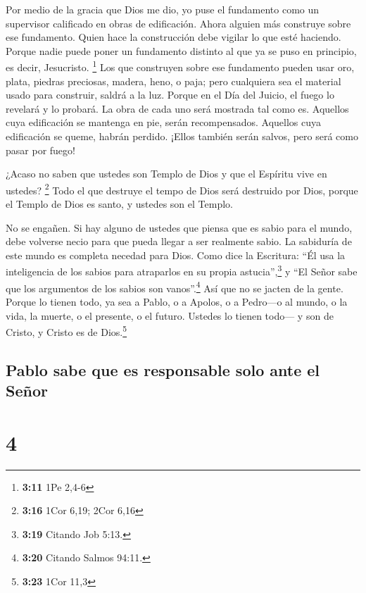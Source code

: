  Por medio de la gracia que Dios me dio, yo puse el
fundamento como un supervisor calificado en obras de edificación. Ahora
alguien más construye sobre ese fundamento. Quien hace la construcción
debe vigilar lo que esté haciendo.  Porque nadie puede
poner un fundamento distinto al que ya se puso en principio, es decir,
Jesucristo. \footnote{\textbf{3:11} 1Pe 2,4-6}  Los que
construyen sobre ese fundamento pueden usar oro, plata, piedras
preciosas, madera, heno, o paja;  pero cualquiera sea el
material usado para construir, saldrá a la luz. Porque en el Día del
Juicio, el fuego lo revelará y lo probará. La obra de cada uno será
mostrada tal como es.  Aquellos cuya edificación se
mantenga en pie, serán recompensados.  Aquellos cuya
edificación se queme, habrán perdido. ¡Ellos también serán salvos, pero
será como pasar por fuego!

 ¿Acaso no saben que ustedes son Templo de Dios y que el
Espíritu vive en ustedes? \footnote{\textbf{3:16} 1Cor 6,19; 2Cor 6,16}
 Todo el que destruye el tempo de Dios será destruido por
Dios, porque el Templo de Dios es santo, y ustedes son el Templo.

 No se engañen. Si hay alguno de ustedes que piensa que
es sabio para el mundo, debe volverse necio para que pueda llegar a ser
realmente sabio.  La sabiduría de este mundo es completa
necedad para Dios. Como dice la Escritura: ``Él usa la inteligencia de
los sabios para atraparlos en su propia astucia'',\footnote{\textbf{3:19}
  Citando Job 5:13.}  y ``El Señor sabe que los
argumentos de los sabios son vanos''.\footnote{\textbf{3:20} Citando
  Salmos 94:11.}  Así que no se jacten de la gente.
Porque lo tienen todo,  ya sea a Pablo, o a Apolos, o a
Pedro---o al mundo, o la vida, la muerte, o el presente, o el futuro.
Ustedes lo tienen todo---  y son de Cristo, y Cristo es
de Dios.\footnote{\textbf{3:23} 1Cor 11,3}

\hypertarget{pablo-sabe-que-es-responsable-solo-ante-el-seuxf1or}{%
\subsection{Pablo sabe que es responsable solo ante el
Señor}\label{pablo-sabe-que-es-responsable-solo-ante-el-seuxf1or}}

\hypertarget{section-3}{%
\section{4}\label{section-3}}

